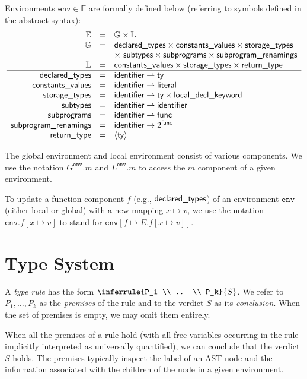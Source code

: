 \documentclass{book}
\newcommand\tenv[0]{\texttt{env}}
\begin{document}
Environments $\tenv \in \mathbb{E}$ are formally defined below (referring to symbols defined in the abstract syntax):
\[
\begin{array}{rcl}
\mathbb{E} 	            &=& \mathbb{G} \times \mathbb{L}\\
\mathbb{G} 	            &=& \textsf{declared\_types} \times \textsf{constants\_values} \times \textsf{storage\_types}\\
  			                & & \times\ \textsf{subtypes} \times \textsf{subprograms} \times \textsf{subprogram\_renamings}\\
\mathbb{L} 	            &=& \textsf{constants\_values} \times \textsf{storage\_types} \times \textsf{return\_type}\\
\hline
\textsf{declared\_types}	        &=& \textsf{identifier} \rightharpoonup \textsf{ty}\\
\textsf{constants\_values}        &=& \textsf{identifier} \rightharpoonup \textsf{literal}\\
\textsf{storage\_types}           &=& \textsf{identifier} \rightharpoonup \textsf{ty} \times \textsf{local\_decl\_keyword}\\
\textsf{subtypes}		            &=& \textsf{identifier} \rightharpoonup \textsf{identifier}\\
\textsf{subprograms}	          &=& \textsf{identifier} \rightharpoonup \textsf{func}\\
\textsf{subprogram\_renamings}	  &=& \textsf{identifier} \rightarrow 2^{\textsf{func}}\\
\textsf{return\_type}             &=& \langle \textsf{ty} \rangle
\end{array}
\]

The global environment and local environment consist of various components. 
We use the notation $G^\tenv.m$ and $L^\tenv.m$ to access the $m$ component of a given environment.

To update a function component $f$ (e.g., $\textsf{declared\_types}$) of an environment $\tenv$ (either local or global)
with a new mapping $x \mapsto v$, we use the notation $\tenv.f[x \mapsto v]$ to stand for $\tenv[f \mapsto E.f[x \mapsto v]]$.

\section{Type System}
A \emph{type rule} has the form $\inferrule{P_1 \\ .. \\ P_k}{S}$. 
We refer to $P_1,\ldots,P_k$ as the \emph{premises} of the rule and to the verdict $S$ as its \emph{conclusion}.
When the set of premises is empty, we may omit them entirely.

When all the premises of a rule hold (with all free variables occurring in the rule implicitly interpreted as universally quantified),
we can conclude that the verdict $S$ holds.
%
The premises typically inspect the label of an AST node and the information associated with the children of the node in a given environment.
\end{document}
